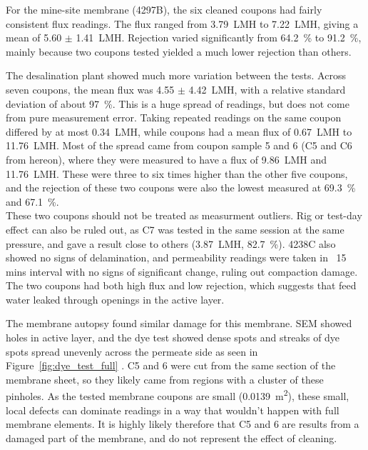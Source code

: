   For the mine-site membrane (4297B), the six cleaned coupons had fairly consistent flux readings. The flux ranged from \qty{3.79}{LMH} to \qty{7.22}{LMH}, giving a mean of 5.60 $\pm$ \qty{1.41}{LMH}. Rejection varied significantly from \qty{64.2}{\percent} to \qty{91.2}{\percent}, mainly because two coupons tested yielded a much lower rejection than others. 

  The desalination plant showed much more variation between the tests. Across seven coupons, the mean flux was 4.55 $\pm$ \qty{4.42}{LMH}, with a relative standard deviation of about \qty{97}{\percent}. This is a huge spread of readings, but does not come from pure measurement error. Taking repeated readings on the same coupon differed by at most \qty{0.34}{LMH}, while coupons had a mean flux of \qty{0.67}{LMH} to \qty{11.76}{LMH}. Most of the spread came from coupon sample 5 and 6 (C5 and C6 from hereon), where they were measured to have a flux of \qty{9.86}{LMH} and \qty{11.76}{LMH}. These were three to six times higher than the other five coupons, and the rejection of these two coupons were also the lowest measured at \qty{69.3}{\percent} and \qty{67.1}{\percent}.\\

  These two coupons should not be treated as measurment outliers. Rig or test-day effect can also be ruled out, as C7 was tested in the same session at the same pressure, and gave a result close to others (\qty{3.87}{LMH}, \qty{82.7}{\percent}). 4238C also showed no signs of delamination, and permeability readings were taken in ~15 mins interval with no signs of significant change, ruling out compaction damage. The two coupons had both high flux and low rejection, which suggests that feed water leaked through openings in the active layer. 

  The membrane autopsy found similar damage for this membrane. SEM showed holes in active layer, and the dye test showed dense spots and streaks of dye spots spread unevenly across the permeate side as seen in Figure~\ref{fig:dye_test_full} \citep{MembraneWorks2025Desal}. C5 and 6 were cut from the same section of the membrane sheet, so they likely came from regions with a cluster of these pinholes. As the tested membrane coupons are small (\qty{0.0139}{m^2}), these small, local defects can dominate readings in a way that wouldn't happen with full membrane elements. It is highly likely therefore that C5 and 6 are results from a damaged part of the membrane, and do not represent the effect of cleaning. 
  
